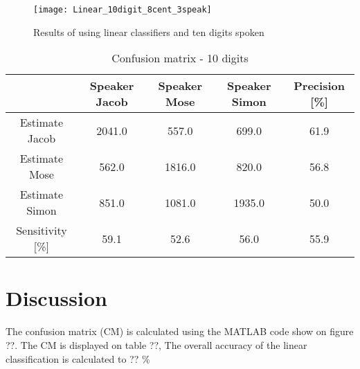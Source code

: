\begin{figure}[H]
\centering
\texttt{[image: Linear\_10digit\_8cent\_3speak]}
\caption{Results of using linear classifiers and ten digits spoken}
\label{fig:Lin_fig_2}
\end{figure}
\begin{table}[H]                                                    
\centering                                                          
\begin{tabular}{|c|c|c|c|c|}                                        
\hline                                                              
  & Speaker Jacob & Speaker Mose & Speaker Simon & Precision [\%] \\
\hline                                                              
Estimate Jacob & 2041.0 & 557.0 & 699.0 & 61.9 \\                   
\hline                                                              
Estimate Mose & 562.0 & 1816.0 & 820.0 & 56.8 \\                    
\hline                                                              
Estimate Simon & 851.0 & 1081.0 & 1935.0 & 50.0 \\                  
\hline                                                              
Sensitivity [\%] & 59.1 & 52.6 & 56.0 & 55.9 \\                     
\hline                                                              
\end{tabular}                                                       
\caption{Confusion matrix - 10 digits}                              
\label{table:Lin_conf_10}                                           
\end{table}                                                         


\section{Discussion}

The confusion matrix (CM) is calculated using the MATLAB code show on figure ??. 
The CM is displayed on table ??, The overall accuracy of the linear classification is  calculated to ?? \%

